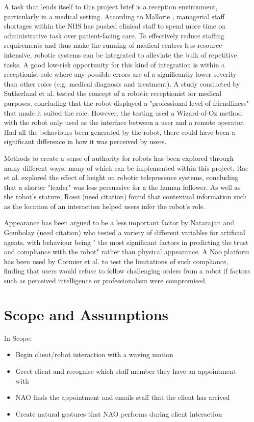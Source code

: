 \documentclass[conference]{IEEEtran}
\begin{document}
A task that lends itself to this project brief is a reception environment, particularly in a medical setting. According to 
Mallorie \cite{mallorie2024}, managerial staff shortages within the NHS has pushed clinical staff to spend more time on administrative task over 
patient-facing care. To effectively reduce staffing requirements and thus make the running of medical centres less resource intensive, robotic 
systems can be integrated to alleviate the bulk of repetitive tasks. A good low-risk opportunity for this kind of integration is within a 
receptionist role where any possible errors are of a significantly lower severity than other roles (e.g. medical diagnosis and treatment).
A study conducted by Sutherland et al. \cite{Sutherland2019} tested the concept of a robotic receptionist for medical purposes, concluding that the robot displayed a 
"professional level of friendliness" that made it suited the role. However, the testing used a Wizard-of-Oz method with the robot only 
used as the interface between a user and a remote operator. Had all the behaviours been generated by the robot, there could have been 
a significant difference in how it was perceived by users.

Methods to create a sense of authority for robots has been explored through many different ways, many of which can be implemented within 
this project. Rae et al. \cite{Rae2013} explored the effect of height on robotic telepresence systems, concluding that a shorter "leader" was less persuasive 
for a the human follower. As well as the robot's stature, Rossi (need citation) found that contextual information such as the location of an interaction 
helped users infer the robot’s role.

Appearance has been argued to be a less important factor by Natarajan and Gombolay (need citation) who tested a variety of different variables for artificial agents, with 
behaviour being " the most significant factors in predicting the trust and compliance with the robot" rather 
than physical appearance. A Nao platform has been used by Cormier et al. \cite{cormier2013v2} to test the limitations of such compliance, finding that users would 
refuse to follow challenging orders from a robot if factors such as perceived intelligence or professionalism were compromised.

\section{Scope and Assumptions} In Scope:
\begin{itemize}
        \item Begin client/robot interaction with a waving motion
        \item Greet client and recognise which staff member they have an appointment with
        \item NAO finds the appointment and emails staff that the client has arrived
        \item Create natural gestures that NAO performs during client interaction    
\end{itemize}
\end{document}
